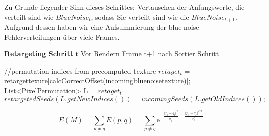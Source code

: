 \cite{hal02158423}

Zu Grunde liegender Sinn dieses Schrittes: Vertauschen der Anfangswerte, die 
verteilt sind wie $BlueNoise_{t}$, sodass Sie verteilt sind wie die 
$BlueNoise_{t+1}$. Aufgrund dessen haben wir eine Aufsummierung der
blue noise Fehlerverteilungen über viele Frames.

\begin{algorithm}[H]
    \caption{\textbf{Retargeting Schritt} t Vor Rendern Frame t+1 nach Sortier Schritt}
    \begin{algorithmic}[1]
        \State //permutation indices from precomputed texture
        \State $retaget_{t}$ = retargettexure[calcCorrectOffset(incomingbluenoisetexture)];
        \State List<PixelPermutation> L = $retaget_{t}$
        \State $retargetedSeeds(L.getNewIndices()) = incomingSeeds(L.getOldIndices());$
        \EndFor
    \end{algorithmic}
    \label{alg:retargeting}
\end{algorithm}

\begin{equation}\label{eq:pixelenergyfunction}
    E(M) = \sum_{p \neq q}E(p,q) = 
           \sum_{p \neq q} \mathrm{e}^{-\frac{\Vert{p_{i}-q_{i}}\Vert^{2}}{\sigma_{i}^{2}} -
           \frac{\Vert{p_{s}-q_{s}}\Vert^{d/2}}{\sigma_{s}^{2}}}
\end{equation}
